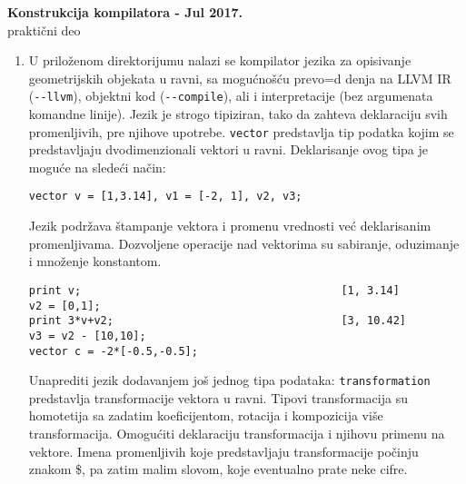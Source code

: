 \documentclass[a4paper]{article}
\def\dj{\leavevmode\setbox0=\hbox{d}\kern0pt
 \rlap{\kern.215em\raise.46\ht0\hbox{-}}d}
\begin{document}
\begin{center}
\textbf{Konstrukcija kompilatora - Jul 2017.}\\
prakti\v cni deo
\end{center}

\begin{enumerate}
\item U prilo\v zenom direktorijumu nalazi se kompilator jezika za
  opisivanje geometrijskih objekata u ravni, sa mogu\' cno\v s\' cu
  prevo\dj enja na LLVM IR (\verb|--llvm|), objektni kod
  (\verb|--compile|), ali i interpretacije (bez argumenata komandne
  linije). Jezik je strogo tipiziran, tako da zahteva deklaraciju svih
  promenljivih, pre njihove upotrebe. \verb"vector" predstavlja tip
  podatka kojim se predstavljaju dvodimenzionali vektori u
  ravni. Deklarisanje ovog tipa je mogu\' ce na slede\' ci na\v cin:
\begin{verbatim}
vector v = [1,3.14], v1 = [-2, 1], v2, v3;
\end{verbatim}
Jezik podr\v zava \v stampanje vektora i promenu vrednosti ve\' c
deklarisanim promenljivama. Dozvoljene operacije nad vektorima su
sabiranje, oduzimanje i mno\v zenje konstantom.
\begin{verbatim}
print v;                                        [1, 3.14]
v2 = [0,1];
print 3*v+v2;                                   [3, 10.42]
v3 = v2 - [10,10];
vector c = -2*[-0.5,-0.5];
\end{verbatim}
Unaprediti jezik dodavanjem jo\v s jednog tipa podataka:
\verb"transformation" predstavlja transformacije vektora u
ravni. Tipovi transformacija su homotetija sa zadatim koeficijentom,
rotacija i kompozicija vi\v se transformacija. Omogu\' citi
deklaraciju transformacija i njihovu primenu na vektore.  Imena
promenljivih koje predstavljaju transformacije po\v cinju znakom \$,
pa zatim malim slovom, koje eventualno prate neke cifre.



\end{enumerate}
\end{document}
